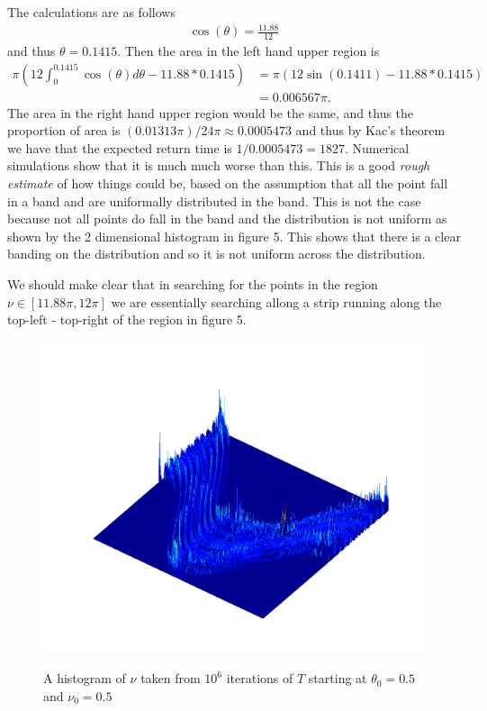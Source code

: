 \documentclass{unswmaths}
\begin{document}
The calculations are as follows
\begin{align*}
    \cos(\theta) = \frac{11.88}{12}
\end{align*}
and thus $ \theta = 0.1415 $. 
Then the area in the left hand upper region is
\begin{align*}
    \pi \left( 12\int_0^{0.1415} \cos(\theta) d\theta - 11.88 * 0.1415\right) &= \pi \left( 12\sin(0.1411) - 11.88 * 0.1415 \right) \\
    &= 0.006567\pi.
\end{align*}
The area in the right hand upper region would be the same, and thus the proportion of area is $ ( 0.01313 \pi) / 24\pi \approx 0.0005473 $ and thus by Kac's theorem we have that the expected return time is $ 1 / 0.0005473 = 1827 $. Numerical simulations show that it is much much worse than this. 
This is a good \emph{rough estimate} of how things could be, based on the assumption that all the point fall in a band and are uniformally distributed in the band. This is not the case because not all points do fall in the band and the distribution is not uniform as shown by the 2 dimensional histogram in figure 5. This shows that there is a clear banding on the distribution and so it is not uniform across the distribution. 

We should make clear that in searching for the points in the region $ \nu \in [11.88\pi, 12\pi] $ we are essentially searching allong a strip running along the top-left - top-right of the region in figure 5.

\begin{figure}[H]
    \includegraphics[scale=0.5]{2d_Histogram}
    \label{2d_Histogram}
    \caption{A histogram of $ \nu $ taken from $ 10^6 $ iterations of $ T $ starting at $ \theta_0 = 0.5 $ and $ \nu_0 = 0.5 $ }
\end{figure}
\end{document}
